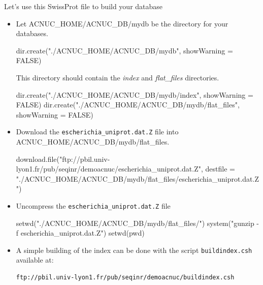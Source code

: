\documentclass{article}
\begin{document}
Let's use this SwissProt file to build your database
\begin{itemize}

\item Let ACNUC\_HOME/ACNUC\_DB/mydb be the directory for your databases.


\begin{Schunk}
\begin{Sinput}
 dir.create("./ACNUC_HOME/ACNUC_DB/mydb", showWarning = FALSE)
\end{Sinput}
\end{Schunk}
This directory should contain the  \textit{index} and \textit{flat\_files} directories.

\begin{Schunk}
\begin{Sinput}
 dir.create("./ACNUC_HOME/ACNUC_DB/mydb/index", showWarning = FALSE)
 dir.create("./ACNUC_HOME/ACNUC_DB/mydb/flat_files", showWarning = FALSE)
\end{Sinput}
\end{Schunk}

\item Download the \texttt{escherichia\_uniprot.dat.Z} file into ACNUC\_HOME/ACNUC\_DB/mydb/flat\_files.

\begin{Schunk}
\begin{Sinput}
 download.file("ftp://pbil.univ-lyon1.fr/pub/seqinr/demoacnuc/escherichia_uniprot.dat.Z", 
     destfile = "./ACNUC_HOME/ACNUC_DB/mydb/flat_files/escherichia_uniprot.dat.Z")
\end{Sinput}
\end{Schunk}


\item Uncompress the \texttt{escherichia\_uniprot.dat.Z} file 

\begin{Schunk}
\begin{Sinput}
 setwd("./ACNUC_HOME/ACNUC_DB/mydb/flat_files/")
 system("gunzip -f escherichia_uniprot.dat.Z")
 setwd(pwd)
\end{Sinput}
\end{Schunk}


\item A simple building of the index can be done with the script  \texttt{buildindex.csh} available at:

\begin{verbatim}
ftp://pbil.univ-lyon1.fr/pub/seqinr/demoacnuc/buildindex.csh
\end{verbatim}



\end{itemize}
\end{document}
